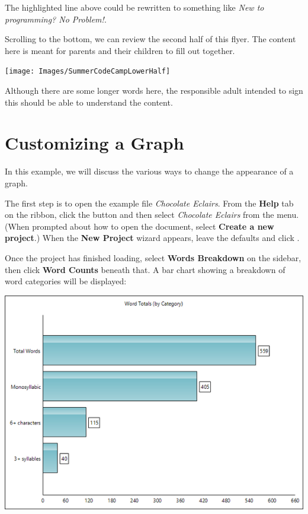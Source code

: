 \documentclass[
]{book}
\theoremstyle{definition}
\theoremstyle{definition}
\theoremstyle{definition}
\theoremstyle{definition}
\theoremstyle{remark}
\begin{document}
The highlighted line above could be rewritten to something like \emph{New to programming? No Problem!}.

Scrolling to the bottom, we can review the second half of this flyer. The content here is meant for parents and their children to fill out together.

\begin{center}\texttt{[image: Images/SummerCodeCampLowerHalf]} \end{center}

Although there are some longer words here, the responsible adult intended to sign this should be able to understand the content.

\newpage

\hypertarget{customizing-a-graph}{%
\section{Customizing a Graph}\label{customizing-a-graph}}

In this example, we will discuss the various ways to change the appearance of a graph.

The first step is to open the example file \emph{Chocolate Eclairs}. From the \textbf{Help} tab on the ribbon, click the  button and then select \emph{Chocolate Eclairs} from the menu. (When prompted about how to open the document, select \textbf{Create a new project}.) When the \textbf{New Project} wizard appears, leave the defaults and click .

Once the project has finished loading, select \textbf{Words Breakdown} on the sidebar, then click \textbf{Word Counts} beneath that. A bar chart showing a breakdown of word categories will be displayed:

\begin{center}\includegraphics[width=0.75\linewidth,]{Images/ExampleGraphDefault} \end{center}
\end{document}
